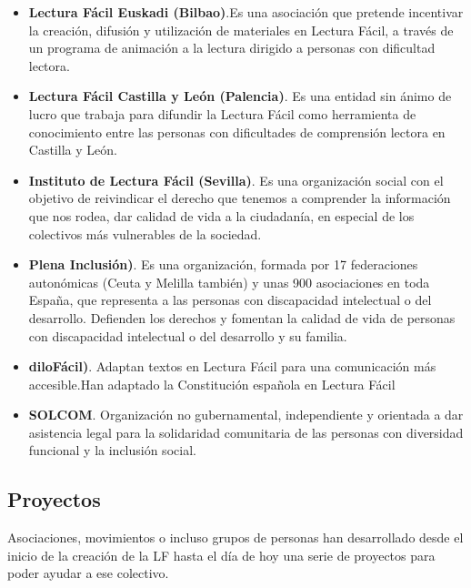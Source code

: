 \begin{itemize}
	\item{\textbf{Lectura Fácil Euskadi (Bilbao)}}\cite{LFEuskadi}.Es una asociación que pretende incentivar la creación, difusión y utilización de materiales en Lectura Fácil, a través de un programa de animación a la lectura dirigido a personas con dificultad lectora.
	
	\item{\textbf{Lectura Fácil Castilla y León (Palencia)}}\cite{LFCastillaLeon}. Es una entidad sin ánimo de lucro que trabaja para difundir la Lectura Fácil como herramienta de conocimiento entre las personas con dificultades de comprensión lectora en Castilla y León.
	
	\item{\textbf{Instituto de Lectura Fácil (Sevilla)}}\cite{LFInstitutoSevilla}. Es una organización social con el objetivo de reivindicar el derecho que tenemos a comprender la información que nos rodea, dar calidad de vida a la ciudadanía, en especial de los colectivos más vulnerables de la sociedad.
	
		\item{\textbf{Plena Inclusión)}}\cite{PlenaInclusion}. Es una organización, formada por 17 federaciones autonómicas (Ceuta y Melilla también) y unas 900 asociaciones en toda España, que representa a las personas con discapacidad intelectual o del desarrollo.	Defienden los derechos y fomentan la calidad de vida de personas con discapacidad intelectual o del desarrollo y su familia. 
		
	\item{\textbf{diloFácil)}}\cite{DiloFacil}. Adaptan textos en Lectura Fácil para una comunicación más accesible.Han adaptado la Constitución española en Lectura Fácil
	
		\item{\textbf{SOLCOM}}\cite{SOLCOM}. Organización no gubernamental, independiente y orientada a dar asistencia legal para la solidaridad comunitaria de las personas con diversidad funcional y la inclusión social.
		
\end{itemize}

\subsection{Proyectos}
Asociaciones, movimientos o incluso grupos de personas han desarrollado desde el inicio de la creación de la LF hasta el día de hoy una serie de proyectos para poder ayudar a ese colectivo. 

